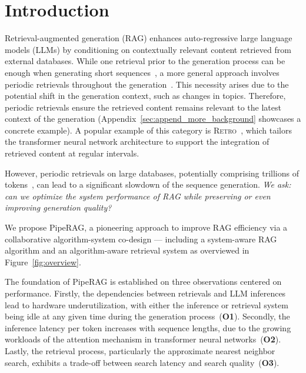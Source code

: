 \section{Introduction}
\label{sec:intro}

Retrieval-augmented generation (RAG) enhances auto-regressive large language models (LLMs) by conditioning on contextually relevant content retrieved from external databases. 
While one retrieval prior to the generation process can be enough when generating short sequences~\cite{lewis2020retrieval, izacard2020leveraging}, a more general approach involves periodic retrievals throughout the generation~\cite{borgeaud2022improving, norlund2023generalization, ram2023context, jiang2023active, trivedi2022interleaving}. This necessity arises due to the potential shift in the generation context, such as changes in topics.  Therefore, periodic retrievals ensure the retrieved content remains relevant to the latest context of the generation (Appendix~\ref{sec:append_more_background} showcases a concrete example). 
A popular example of this category is \textsc{Retro}~\cite{borgeaud2022improving}, which tailors the transformer neural network architecture to support the integration of retrieved content at regular intervals.

However, periodic retrievals on large databases, potentially comprising trillions of tokens~\cite{borgeaud2022improving}, can lead to a significant slowdown of the sequence generation. \textit{We ask: can we optimize the system performance of RAG while preserving or even improving generation quality?} 

 
We propose PipeRAG, a pioneering approach to improve RAG efficiency via a collaborative algorithm-system co-design --- including a system-aware RAG algorithm and an algorithm-aware retrieval system as overviewed in Figure~\ref{fig:overview}. 

The foundation of PipeRAG is established on three observations centered on performance. Firstly, the dependencies between retrievals and LLM inferences lead to hardware underutilization, with either the inference or retrieval system being idle at any given time during the generation process~(\textbf{O1}). Secondly, the inference latency per token increases with sequence lengths, due to the growing workloads of the attention mechanism in transformer neural networks~(\textbf{O2}). Lastly, the retrieval process, particularly the approximate nearest neighbor search, exhibits a trade-off between search latency and search quality~(\textbf{O3}).

